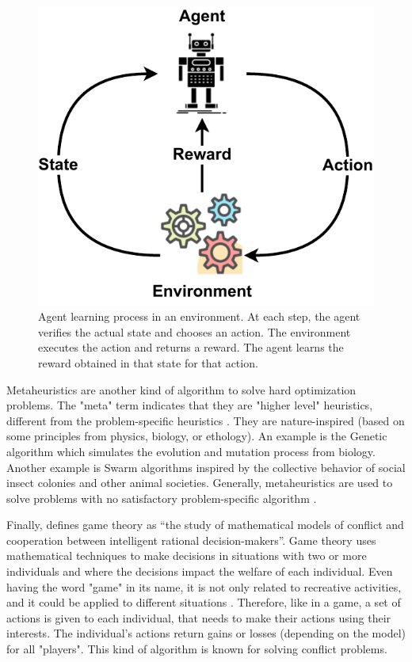 \begin{figure}[!htb]
    \centering
    \includegraphics[scale=0.6]{Images/Related_works/Reinforcement_learning.pdf}
    \caption{Agent learning process in an environment. At each step, the agent verifies the actual state and chooses an action. The environment executes the action and returns a reward. The agent learns the reward obtained in that state for that action.}
    \label{fig:reinforcement}
\end{figure}

Metaheuristics are another kind of algorithm to solve hard optimization problems. The "meta" term indicates that they are "higher level" heuristics, different from the problem-specific heuristics \cite{boussaid2013survey}. They are nature-inspired (based on some principles from physics, biology, or ethology). An example is the Genetic algorithm which simulates the evolution and mutation process from biology. Another example is Swarm algorithms inspired by the collective behavior of social insect colonies and other animal societies. Generally, metaheuristics are used to solve problems with no satisfactory problem-specific algorithm \cite{boussaid2013survey}.

Finally, \citeauthor{myerson1991game} defines game theory as ``the study of mathematical models of conflict and cooperation between intelligent rational decision-makers''. Game theory uses mathematical techniques to make decisions in situations with two or more individuals and where the decisions impact the welfare of each individual. Even having the word "game" in its name, it is not only related to recreative activities, and it could be applied to different situations \cite{myerson1991game, osborne2004introduction}. Therefore, like in a game, a set of actions is given to each individual, that needs to make their actions using their interests. The individual's actions return gains or losses (depending on the model) for all "players". This kind of algorithm is known for solving conflict problems.

